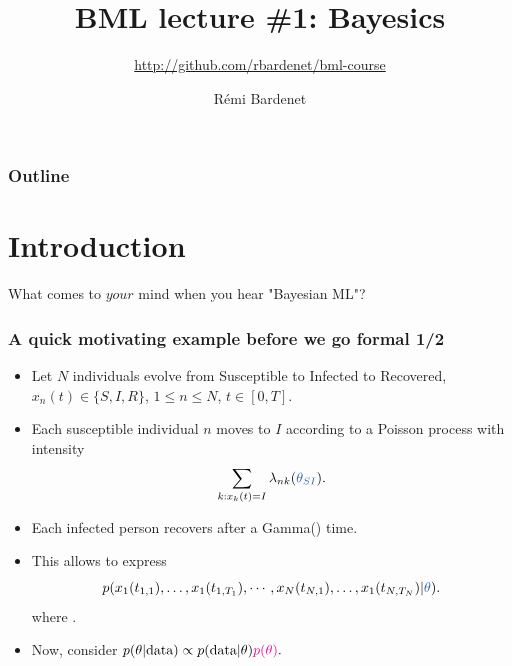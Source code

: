 \documentclass[10pt]{beamer}
\title[Bayesian ML: Bayesics]{BML lecture \#1: Bayesics}
\subtitle{\url{http://github.com/rbardenet/bml-course}}
\author[Rémi Bardenet (CNRS \& Univ. Lille)] %
{Rémi Bardenet}
\institute[] %
{
  CNRS \& CRIStAL, Univ. Lille, France\\
\vspace{1cm}
\texttt{[image: /Users/rbardenet/Work/Tex/PosterImages/logoCNRS.pdf]}
\qquad \texttt{[image: /Users/rbardenet/Work/Tex/PosterImages/cristalLogo.pdf]}
}
\date{}
\begin{document}
\begin{frame}
\maketitle
\end{frame}

\begin{frame}
\frametitle{Outline}
\tableofcontents
\end{frame}

\section{Introduction}

\begin{frame}{What comes to $your$ mind when you hear "Bayesian ML"?}

\end{frame}

\begin{frame}
  \frametitle{A quick motivating example before we go formal 1/2}
  \begin{itemize}
    \vfill\item Let $N$ individuals evolve from Susceptible to Infected to Recovered, $x_n(t) \in\{S,I,R\}$, $1\leq n\leq N$, $t\in[0,T]$.
    \vfill\item Each susceptible individual $n$ moves to $I$ according to a Poisson process with intensity
    $$\sum_{k:x_k(t)=I} \lambda_{nk}(\unn{\theta_{SI}}).$$
    \vfill\item Each infected person recovers after a Gamma() time.
    \vfill\item This allows to express
    $$
    p(x_1(t_{1,1}), \dots, x_1(t_{1,T_1}), \cdots, x_N(t_{N,1}), \dots, x_1(t_{N,T_N})\vert \unn{\theta}).
    $$
    where .
    \vfill\item Now, consider $p(\theta\vert \text{data}) \propto p(\text{data}\vert \theta) \textcolor{magenta}{p(\theta)}.$
  \end{itemize}
\end{frame}
\end{document}
